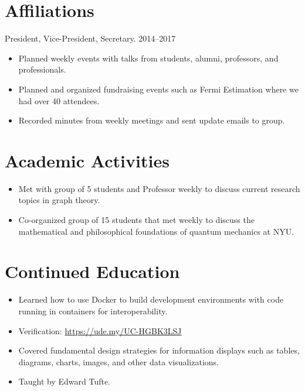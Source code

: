 \documentclass{cultvoucher}
\begin{document}
\section{Affiliations}



         {President, Vice-President, Secretary.}
         {2014--2017}
\begin{itemize}
      \item Planned weekly events with talks from students, alumni, professors,
            and professionals.
      \item Planned and organized fundraising events such as Fermi Estimation
            where we had over 40 attendees.
      \item Recorded minutes from weekly meetings and sent update emails to group.
\end{itemize}

\section{Academic Activities}
\begin{itemize}
    \item Met with group of 5 students and Professor weekly to discuss current
          research topics in graph theory.
\end{itemize}

\begin{itemize}
    \item Co-organized group of 15 students that met weekly to discuss the
          mathematical and philosophical foundations of quantum mechanics at
          NYU.
\end{itemize}

\section{Continued Education}
\begin{itemize}
    \item Learned how to use Docker to build development environments with code
          running in containers for interoperability.
    \item Verification: \url{https://ude.my/UC-HGBK3LSJ}
\end{itemize}
\begin{itemize}
    \item Covered fundamental design strategies for information displays
          such as tables, diagrams, charts, images, and other data
          visualizations.
    \item Taught by Edward Tufte.
\end{itemize}
\end{document}
